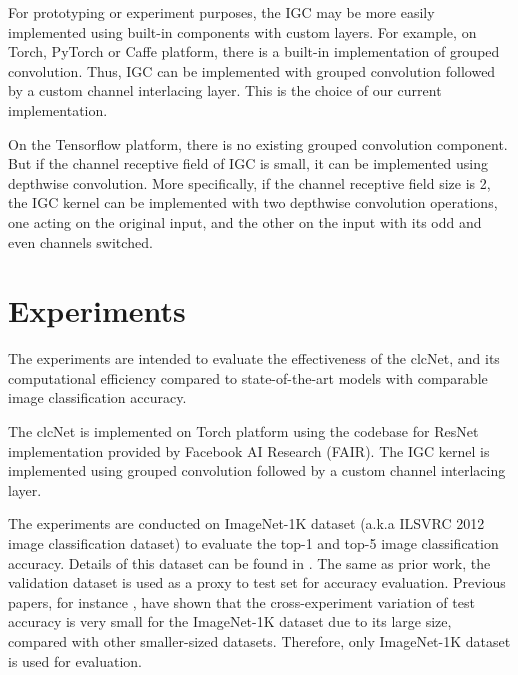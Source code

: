 \documentclass[10pt,twocolumn,letterpaper]{article}
\begin{document}
For prototyping or experiment purposes, the IGC may be more easily implemented using built-in components with custom layers. For example, on Torch\cite{torch2011collobert}, PyTorch or Caffe\cite{caffe2014jia} platform, there is a built-in implementation of grouped convolution. Thus, IGC can be implemented with grouped convolution followed by a custom channel interlacing layer. This is the choice of our current implementation.

On the Tensorflow\cite{tensorflow2016abadi} platform, there is no existing grouped convolution component. But if the channel receptive field of IGC is small, it can be implemented using depthwise convolution. More specifically, if the channel receptive field size is 2, the IGC kernel can be implemented with two depthwise convolution operations, one acting on the original input, and the other on the input with its odd and even channels switched.

\section{Experiments}

The experiments are intended to evaluate the effectiveness of the clcNet, and its computational efficiency compared to state-of-the-art models with comparable image classification accuracy. 

The clcNet is implemented on Torch platform using the codebase \cite{fb.resnet} for ResNet implementation provided by Facebook AI Research (FAIR). The IGC kernel is implemented using grouped convolution followed by a custom channel interlacing layer.

The experiments are conducted on ImageNet-1K dataset (a.k.a ILSVRC 2012 image classification dataset) to evaluate the top-1 and top-5 image classification accuracy. Details of this dataset can be found in \cite{ilsvrc2015olga}. The same as prior work, the validation dataset is used as a proxy to test set for accuracy evaluation. Previous papers, for instance \cite{resnet2016he}, have shown that the cross-experiment variation of test accuracy is very small for the ImageNet-1K dataset due to its large size, compared with other smaller-sized datasets. Therefore, only ImageNet-1K dataset is used for evaluation.
\end{document}

